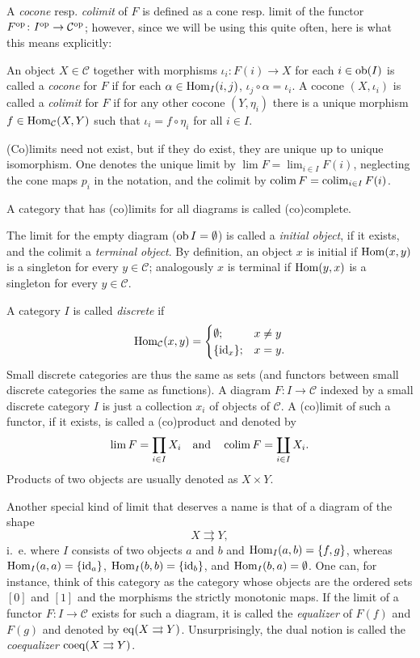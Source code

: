 \documentclass[a4paper,openany]{scrbook}
\renewcommand{\C}{\mathcal C}
\begin{document}
A \emph{cocone} resp. \emph{colimit} of $F$ is defined as a cone resp. limit of the functor $F^\op\colon I^\op \to \C^\op$; however, since we will be using this quite often, here is what this means explicitly:

\begin{defn} An object $X \in \C$ together with morphisms $\iota_i\colon F(i) \to X$ for each $i \in \operatorname{ob}(I)$ is called a \emph{cocone} for $F$ if for each $\alpha \in \operatorname{Hom}_I(i,j)$, $\iota_j \circ \alpha = \iota_i$. A cocone $(X,\iota_i)$ is called a \emph{colimit} for $F$ if for any other cocone $(Y,\eta_i)$ there is a unique morphism $f \in \Hom_\C(X,Y)$ such that $\iota_i = f \circ \eta_i$ for all $i \in I$.
\end{defn}

(Co)limits need not exist, but if they do exist, they are unique up to unique isomorphism. One denotes the unique limit by $\lim F = \lim_{i \in I} F(i)$, neglecting the cone maps $p_i$ in the notation, and the colimit by $\colim F = \colim_{i \in I} F(i)$.

A category that has (co)limits for all diagrams is called (co)complete.

The limit for the empty diagram ($\operatorname{ob} I = \emptyset$) is called a \emph{initial object}, if it exists, and the colimit a \emph{terminal object}. By definition, an object $x$ is initial if $\operatorname{Hom}(x,y)$ is a singleton for every $y \in \C$; analogously $x$ is terminal if $\operatorname{Hom}(y,x)$ is a singleton for every $y \in \C$.

A category $I$ is called \emph{discrete} if 
\[
\Hom_\C(x,y) =\begin{cases} \emptyset; & x \neq y\\ \{\id_x\}; & x = y.\end{cases}
\]
Small discrete categories are thus the same as sets (and functors between small discrete categories the same as functions). A diagram $F\colon I \to \C$ indexed by a small discrete category $I$ is just a collection $x_i$ of objects of $\C$. A (co)limit of such a functor, if it exists, is called a (co)product and denoted by
\[
\lim F = \prod_{i \in I} X_i \quad\text{and}\quad \colim F = \coprod_{i \in I} X_i.
\]
Products of two objects are usually denoted as $X \times Y$.

Another special kind of limit that deserves a name is that of a diagram of the shape
\[
X \rightrightarrows Y,
\]
i.~e. where $I$ consists of two objects $a$ and $b$ and $\operatorname{Hom}_I(a,b) = \{f,g\}$, whereas $\operatorname{Hom}_I(a,a) = \{\operatorname{id}_a\}$, $\operatorname{Hom}_I(b,b) = \{\operatorname{id}_b\}$, and $\operatorname{Hom}_I(b,a) = \emptyset$. One can, for instance, think of this category as the category whose objects are the ordered sets $[0]$ and $[1]$ and the morphisms the strictly monotonic maps. If the limit of a functor $F\colon I \to \C$ exists for such a diagram, it is called the \emph{equalizer} of $F(f)$ and $F(g)$ and denoted by $\operatorname{eq}(X \rightrightarrows Y)$. Unsurprisingly, the dual notion is called the \emph{coequalizer} $\operatorname{coeq}(X \rightrightarrows Y)$.
\end{document}
